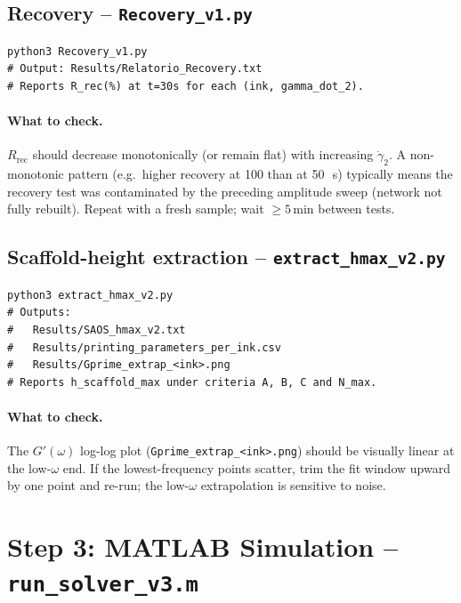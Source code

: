 \documentclass[11pt,a4paper]{article}
\newcommand{\gd}{\dot{\gamma}}
\begin{document}
\subsection{Recovery -- \texttt{Recovery\_v1.py}}

\begin{lstlisting}[style=shell]
python3 Recovery_v1.py
# Output: Results/Relatorio_Recovery.txt
# Reports R_rec(%) at t=30s for each (ink, gamma_dot_2).
\end{lstlisting}

\paragraph{What to check.}
$R_\mathrm{rec}$ should decrease monotonically (or remain flat) with
increasing $\gd_2$. A non-monotonic pattern (e.g.\ higher recovery at
100 than at 50\,\si{\per\s}) typically means the recovery test was
contaminated by the preceding amplitude sweep (network not fully rebuilt).
Repeat with a fresh sample; wait $\geq 5\,\si{\minute}$ between tests.

\subsection{Scaffold-height extraction -- \texttt{extract\_hmax\_v2.py}}

\begin{lstlisting}[style=shell]
python3 extract_hmax_v2.py
# Outputs:
#   Results/SAOS_hmax_v2.txt
#   Results/printing_parameters_per_ink.csv
#   Results/Gprime_extrap_<ink>.png
# Reports h_scaffold_max under criteria A, B, C and N_max.
\end{lstlisting}

\paragraph{What to check.}
The $G'(\omega)$ log-log plot (\texttt{Gprime\_extrap\_<ink>.png})
should be visually linear at the low-$\omega$ end. If the lowest-frequency
points scatter, trim the fit window upward by one point and re-run;
the low-$\omega$ extrapolation is sensitive to noise.

\section{Step 3: MATLAB Simulation -- \texttt{run\_solver\_v3.m}}
\label{sec:matlab}
\end{document}
